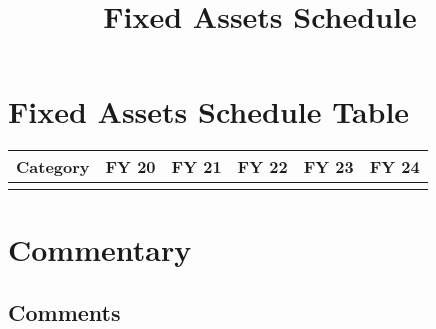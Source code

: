 \documentclass{article}
\begin{document}
\title{\textbf{Fixed Assets Schedule}}
\date{}
\maketitle

\section*{Fixed Assets Schedule Table}

\begin{tabularx}{\textwidth}{|X|c|c|c|c|c|}
    \hline
    \rowcolor{blue!20}
    \textbf{Category} & \textbf{FY 20} & \textbf{FY 21} & \textbf{FY 22} & \textbf{FY 23} & \textbf{FY 24} \\
    \hline
    {%
    {{ category }} & {%
    \hline
    {%
\end{tabularx}

\section*{Commentary}
\begin{tcolorbox}[colback=white]
\subsection*{Comments}
\end{tcolorbox}
\end{document}
